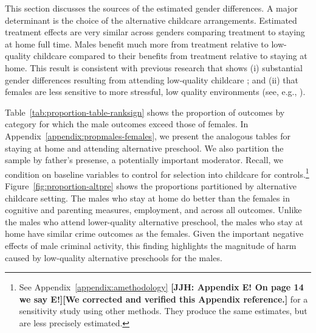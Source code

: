 This section discusses the sources of the estimated gender differences. A major determinant is the choice of the alternative childcare arrangements. Estimated treatment effects are very similar across genders comparing treatment to staying at home full time. Males benefit much more from treatment relative to low-quality childcare compared to their benefits from treatment relative to staying at home. This result is consistent with previous research that shows (i) substantial gender differences resulting from attending low-quality childcare \citep{Kottelenberg-Lehrer_2014_Gender-Effects,Baker_Gruber_Milligan_2015_Noncog_Defects}; and (ii) that females are less sensitive to more stressful, low quality environments (see, e.g., \citealp{golding2016psychology,Autor-etal_2015_Family-Disadvantage}).

Table~\ref{tab:proportion-table-ranksign} shows the proportion of outcomes by category for which the male outcomes exceed those of females. In Appendix~\ref{appendix:propmales-females}, we present the analogous tables for staying at home and attending alternative preschool. We also partition the sample by father's presense, a potentially important moderator. Recall, we condition on baseline variables to control for selection into childcare for controls.\footnote{See Appendix~\ref{appendix:amethodology} \textbf{[JJH: Appendix E! On page 14 we say E!][We corrected and verified this Appendix reference.]} for a sensitivity study using other methods. They produce the same estimates, but are less precisely estimated.} Figure~\ref{fig:proportion-altpre} shows the proportions partitioned by alternative childcare setting. The males who stay at home do better than the females in cognitive and parenting measures, employment, and across all outcomes. Unlike the males who attend lower-quality alternative preschool, the males who stay at home have similar crime outcomes as the females. Given the important negative effects of male criminal activity, this finding highlights the magnitude of harm caused by low-quality alternative preschools for the males.

